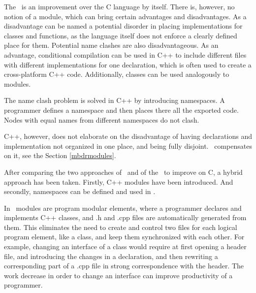 
% 

The \cpppl\ is an improvement over the C language by itself. There is, however, no notion of a module,
which can bring certain advantages and disadvantages. As a disadvantage can be named a potential disorder
in placing implementations for classes and functions, as the language itself does not enforce a clearly defined
place for them. Potential name clashes are also disadvantageous. 
As an advantage, conditional compilation can be used in C++ to include different files
with different implementations for one declaration, which is often used to create a cross-platform C++
code. Additionally, classes can be used analogously to modules.

The name clash problem is solved in C++ by introducing namespaces. A programmer defines a namespace 
and then places there all the exported code. Nodes with equal names from different namespaces do not clash.

C++, however, does not elaborate on the disadvantage of having declarations and implementation not organized in 
one place, and being fully disjoint. \mbdr\ compensates on it, see the Section \ref{mbdrmodules}.

After comparing the two approaches of \mbdr\ and of the \cpppl\ to improve on C, a hybrid approach
has been taken. Firstly, C++ modules have been introduced. And secondly, namespaces
can be defined and used in \pcpp.

In \pcpp\ modules are program modular elements, where a programmer declares and implements C++ classes,
and .h and .cpp files are automatically generated from them. This eliminates the need to 
create and control two files for each logical program element, like a class, and keep them synchronized with
each other. For example, changing an interface of a class would require at first opening a header file, 
and introducing the changes in a declaration, and then rewriting a corresponding part of a .cpp file 
in strong correspondence with the header. The work decrease in order to change an interface can improve
productivity of a programmer.

